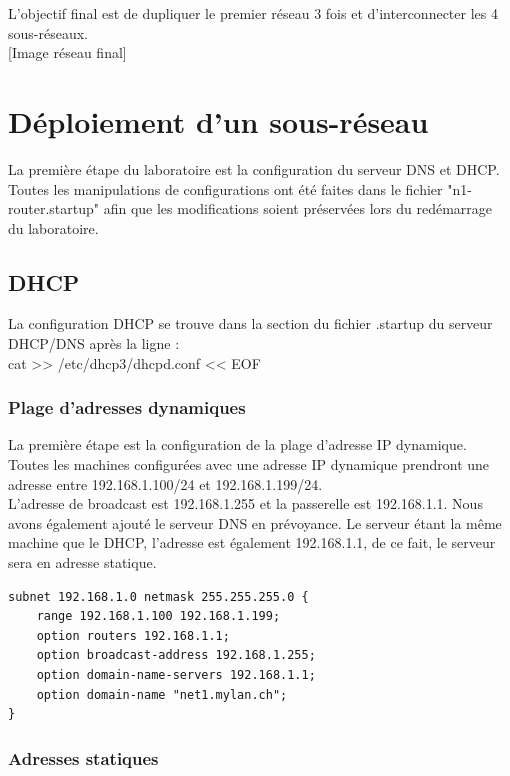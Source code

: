 \documentclass{article}
\begin{document}
L'objectif final est de dupliquer le premier réseau 3 fois et d'interconnecter les 4 sous-réseaux.\\

[Image réseau final]


\section{Déploiement d'un sous-réseau}

La première étape du laboratoire est la configuration du serveur DNS et DHCP. Toutes les manipulations de configurations ont été faites dans le fichier "n1-router.startup" afin que les modifications soient préservées lors du redémarrage du laboratoire.

\subsection{DHCP}

La configuration DHCP se trouve dans la section du fichier .startup du serveur DHCP/DNS après la ligne : \\

cat >> /etc/dhcp3/dhcpd.conf << EOF

\subsubsection{Plage d'adresses dynamiques}

La première étape est la configuration de la plage d'adresse IP dynamique. Toutes les machines configurées avec une adresse IP dynamique prendront une adresse entre 192.168.1.100/24 et 192.168.1.199/24.\\

L'adresse de broadcast est 192.168.1.255 et la passerelle est 192.168.1.1. Nous avons également ajouté le serveur DNS en prévoyance. Le serveur étant la même machine que le DHCP, l'adresse est également 192.168.1.1, de ce fait, le serveur sera en adresse statique.\\

\begin{lstlisting}
subnet 192.168.1.0 netmask 255.255.255.0 {
	range 192.168.1.100 192.168.1.199;
	option routers 192.168.1.1;
	option broadcast-address 192.168.1.255;
	option domain-name-servers 192.168.1.1;
	option domain-name "net1.mylan.ch";
}
\end{lstlisting}


\subsubsection{Adresses statiques}
\end{document}
